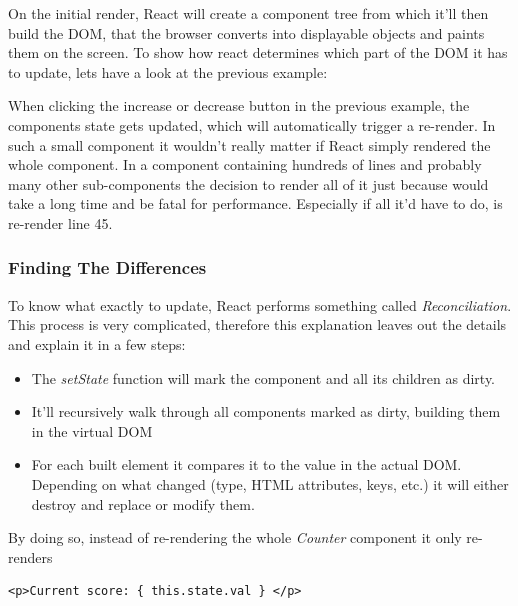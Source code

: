 On the initial render, React will create a component tree from which it'll then build the DOM, that the browser converts into displayable objects and paints them on the screen. To show how react determines which part of the DOM it has to update, lets have a look at the previous example:

When clicking the increase or decrease button in the previous example, the components state gets updated, which will automatically trigger a re-render. In such a small component it wouldn't really matter if React simply rendered the whole component. In a component containing hundreds of lines and probably many other sub-components the decision to render all of it just because would take a long time and be fatal for performance. Especially if all it'd have to do, is re-render line 45.

\newpage
\subsubsection{Finding The Differences}
To know what exactly to update, React performs something called \emph{Reconciliation}. This process is very complicated, therefore this explanation leaves out the details and explain it in a few steps: 
\begin{itemize}
\item The \emph{setState} function will mark the component and all its children as dirty. \cite{GethylGeorgeKurian}
\item It'll recursively walk through all components marked as dirty, building them in the virtual DOM \cite{GethylGeorgeKurian}
\item For each built element it compares it to the value in the actual DOM. Depending on what changed (type, HTML attributes, keys, etc.) it will either destroy and replace or modify them.  \cite{ReactDocs} 
\end{itemize}
By doing so, instead of re-rendering the whole \emph{Counter} component it only re-renders
\begin{lstlisting}[caption={Updated line}]
<p>Current score: { this.state.val } </p>
\end{lstlisting}

